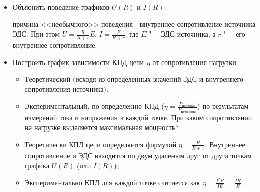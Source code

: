 \AdditionalQuestions
\begin{itemize}
    \item Объяснить поведение графиков \(U(R)\) и \(I(R)\).\par
    \Answer причина <<необычного>> поведения - внутреннее сопротивление источника ЭДС. При этом \(U=\frac{R}{R+r}E\), \(I=\frac{E}{R+r}\), где \(E\) "--- ЭДС источника, а \(r\) "--- его внутреннее сопротивление.
    \item Построить график зависимости КПД цепи \(\eta\) от сопротивления нагрузки:
    \begin{itemize} 
        \item Теоретический (исходя из определенных значений ЭДС и внутреннего сопротивления источника).
        \item Экспериментальный, по определению КПД (\(\eta=\frac{P_\text{полезная}}{P_\text{источника}}\)) по результатам измерений тока и напряжения в каждой точке. При каком сопротивлении на нагрузке выделяется максимальная мощность?
    \end{itemize}
    \Answer \begin{itemize}
        \item Теоретически КПД цепи определяется формулой \(\eta=\frac{R}{R+r}\), Внутреннее сопротивление и ЭДС находится по двум удаленым друг от друга точкам графика \(U(R)\) (или \(I(R)\));
        \item Экспериментально КПД для каждой точке считается как \(\eta=\frac{I^2 R}{IE}=\frac{IR}{E}\).
    \end{itemize}
\end{itemize}

